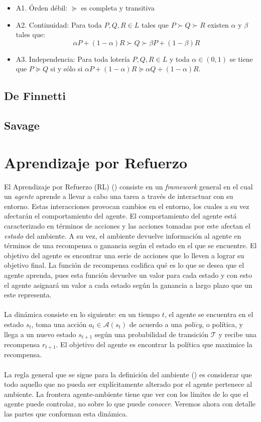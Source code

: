 \documentclass[11pt]{article}
\theoremstyle{plain}
\begin{document}
\begin{itemize}
\item A1. Órden débil: $\succeq$ es completa y transitiva
\item A2. Continuidad: Para toda $P,Q,R \in L$ tales que $P \succ Q \succ R$ existen $\alpha$ y $\beta$ tales que:
\[  \alpha P + (1-\alpha) R \succ Q \succ \beta P + (1-\beta) R\]
\item A3. Independencia: Para toda lotería $P,Q,R \in L$ y toda $\alpha \in (0,1)$ se tiene que $P \succeq Q$ si y sólo si $\alpha P + (1-\alpha) R \succeq \alpha Q  + (1-\alpha) R$.

\end{itemize}
\subsection{De Finnetti}
\subsection{Savage}
\section{Aprendizaje por Refuerzo}
El Aprendizaje por Refuerzo (RL) (\cite{sutton1998reinforcement}) consiste en un \textit{framework} general en el cual un \textit{agente} aprende a llevar a cabo una tarea a través de interactuar con su entorno. Estas interacciones provocan cambios en el entorno, los cuales a su vez afectarán el comportamiento del agente. El comportamiento del agente está caracterizado en términos de acciones y las acciones tomadas por este afectan el \textit{estado} del ambiente. A su vez, el ambiente devuelve información al agente en términos de una recompensa o ganancia según el estado en el que se encuentre. El objetivo del agente es encontrar una serie de acciones que lo lleven a lograr su objetivo final. La función de recompensa codifica qué es lo que se desea que el agente aprenda, pues esta función devuelve un valor para cada estado y con esto el agente asignará un valor a cada estado según la ganancia a largo plazo que un este representa.\\
\\
La dinámica consiste en lo siguiente: en un tiempo $t$, el agente se encuentra en el estado $s_t$, toma una acción $a_t \in \mathcal{A}(s_t)$ de acuerdo a una \textit{policy}, o política, y llega a un nuevo estado $s_{t+1}$ según una probabilidad de transición $\mathcal{T}$ y recibe una recompensa $r_{t+1}$. El objetivo del agente es encontrar la política que maximice la recompensa.\\
\\
La regla general que se sigue para la definición del ambiente (\cite{sutton1998reinforcement}) es considerar que todo aquello que no pueda ser explícitamente alterado por el agente pertenece al ambiente. La frontera agente-ambiente tiene que ver con los límites de lo que el agente puede controlar, no sobre lo que puede \textit{conocer}.
Veremos ahora con detalle las partes que conforman esta dinámica. 
\end{document}
